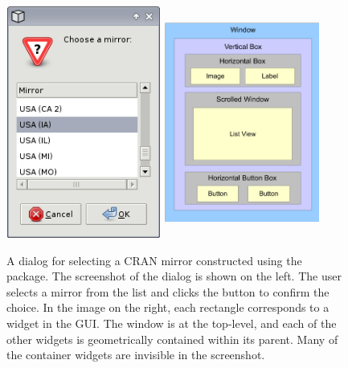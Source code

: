 \documentclass[article,shortnames]{jss}
\begin{document}
\begin{figure}[b!p]
  \begin{center}
    \includegraphics[width=2in,height=3in]{cran-mirror.png}
    \hspace{.5in}
    \includegraphics[width=2in,height=3in]{widget-hierarchy.pdf}
    \caption{\label{fig:cran-mirror}\label{fig:widget-hierarchy} A
dialog
      for selecting a CRAN mirror constructed using the 
package. The
      screenshot of the dialog is shown on the left. The user selects
a
      mirror from the list and clicks the  button to confirm
the
      choice.  In the image on the right, each rectangle corresponds
to a
      widget in the GUI. The window is at the top-level, and each of
the
      other widgets is geometrically contained within its parent. Many
of
      the container widgets are invisible in the screenshot.}
  \end{center}
\end{figure}
\end{document}
